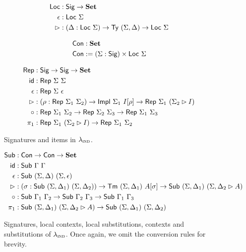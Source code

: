 \begin{figure}[h]
\begin{minipage}[t]{0.5\textwidth}
\begin{align*}
  \Loc &: \Sig \to \Set \\
  \epsilon &: \Loc\ \Sigma \\
  \rhd &: (\Delta : \Loc\ \Sigma) \to \Ty\ (\Sigma,\Delta) \to \Loc\ \Sigma
  \end{align*}
  \end{minipage}
  \begin{minipage}[t]{0.5\textwidth}
  \begin{align*}
  \textsf{Con} &: \mathbf{Set} \\
  \textsf{Con} &:= (\Sigma : \textsf{Sig}) \times \textsf{Loc}\ \Sigma
  \end{align*}
  \end{minipage}
  \begin{minipage}[t]{0.5\textwidth}
  \begin{align*}
  \Rep &: \Sig \to \Sig \to \Set \\
  \mta{id} &: \Rep\ \Sigma\ \Sigma \\
  \epsilon &: \Rep\ \Sigma\ \epsilon \\
  \rhd &: (\rho : \Rep\ \Sigma_1\ \Sigma_2) \to \Impl\ \Sigma_1\ I[\rho] \to \Rep\ \Sigma_1\ (\Sigma_2\rhd I) \\
  \circ &: \Rep\ \Sigma_1\ \Sigma_2 \to \Rep\ \Sigma_2\ \Sigma_3 \to \Rep\ \Sigma_1\ \Sigma_3 \\
  \pi_1 &: \Rep\ \Sigma_1\ (\Sigma_2 \rhd I) \to \Rep\ \Sigma_1\ \Sigma_2
  \end{align*}
  \end{minipage}
  \caption{Signatures and items in $\lambda_{\textsc{ind}}$.}
  \label{fig:signatures-items}
\end{figure}
\begin{figure}[h]
  \begin{minipage}[t]{\textwidth}
  \begin{align*}
  \Sub &: \Con \to \Con \to \Set \\
  \mta{id} &: \Sub\ \Gamma\ \Gamma \\
  \epsilon &: \Sub\ (\Sigma, \Delta)\ (\Sigma, \epsilon) \\
  \rhd &: (\sigma : \Sub\ (\Sigma,\Delta_1)\ (\Sigma,\Delta_2)) \to \Tm\ (\Sigma, \Delta_1)\ A[\sigma] \to \Sub\ (\Sigma,\Delta_1)\ (\Sigma,\Delta_2 \rhd A) \\
  \circ &: \Sub\ \Gamma_1\ \Gamma_2 \to \Sub\ \Gamma_2\ \Gamma_3 \to \Sub\ \Gamma_1\ \Gamma_3 \\
  \pi_1 &: \Sub\ (\Sigma,\Delta_1)\ (\Sigma, \Delta_2 \rhd A) \to \Sub\ (\Sigma,\Delta_1)\ (\Sigma,\Delta_2) 
  \end{align*}
  \end{minipage}
  \caption{Signatures, local contexts, local substitutions, contexts and substitutions of $\lambda_{\textsc{ind}}$. Once again, we omit the conversion rules for brevity.}
  \label{fig:signatures-local-contexts}
\end{figure}

